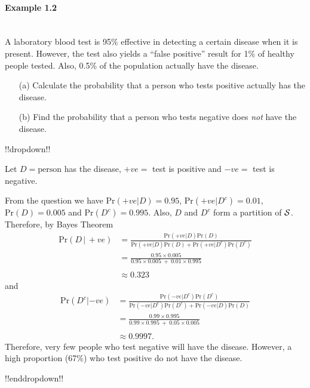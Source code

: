 \paragraph{Example 1.2}{~\\
A laboratory blood test is 95\% effective in detecting a certain
disease when it is present. However, the test also yields a ``false
positive'' result for 1\% of healthy people tested. Also, 0.5\% of the
population actually have the disease.

\begin{itemize}
\item [(a)] Calculate the probability that a person who tests positive actually has the disease.
\item [(b)] Find the probability that a person who tests negative does \textit{not} have the disease.
\end{itemize}}


!!dropdown!!

Let $D=\text{person}$ has the disease, $+ve=$ test is positive and $-ve=$ test is negative.  

    From the question
    we have $\text{Pr}(+ve|D)=0.95$, $\text{Pr}(+ve|D^c)=0.01$, $\text{Pr}(D)=0.005$ and
    $\text{Pr}(D^c)=0.995$.  Also, $D$ and $D^c$ form a partition of ${\cal
    S}$. Therefore, by Bayes Theorem
    \begin{align*}
    \text{Pr}(D\,|\, +ve) &=\frac{\text{Pr}(+ve|D)\text{Pr}(D)}{\text{Pr}(+ve|D)\text{Pr}(D)+\text{Pr}(+ve|D^c)\text{Pr}(D^c)} \\
    &=\frac{0.95\times 0.005}{0.95\times 0.005~+~0.01\times 0.995} \\ \\
    &\approx 0.323
    \end{align*}
    and
    \begin{align*}
    \text{Pr}(D^c|-ve) &=\frac{\text{Pr}(-ve|D^c)\text{Pr}(D^c)}{\text{Pr}(-ve|D^c)\text{Pr}(D^c)+\text{Pr}(-ve|D)\text{Pr}(D)} \\
    &=\frac{0.99\times 0.995}{0.99\times 0.995~+~0.05\times 0.005} \\ \\
    &\approx 0.9997.
    \end{align*}
    Therefore, very few people who test negative will have the
    disease. However, a high proportion (67\%) who test positive do not
    have the disease.

!!enddropdown!!





